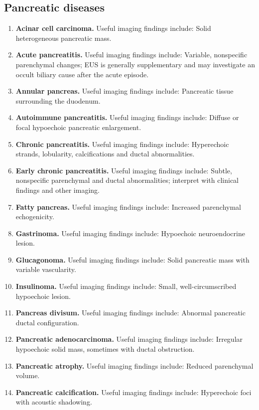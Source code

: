 \subsection{Pancreatic diseases}
\begin{enumerate}[leftmargin=*,itemsep=0.45em,topsep=0.4em]
\item \textbf{Acinar cell carcinoma.} Useful imaging findings include: Solid heterogeneous pancreatic mass.
\item \textbf{Acute pancreatitis.} Useful imaging findings include: Variable, nonspecific parenchymal changes; EUS is generally supplementary and may investigate an occult biliary cause after the acute episode.
\item \textbf{Annular pancreas.} Useful imaging findings include: Pancreatic tissue surrounding the duodenum.
\item \textbf{Autoimmune pancreatitis.} Useful imaging findings include: Diffuse or focal hypoechoic pancreatic enlargement.
\item \textbf{Chronic pancreatitis.} Useful imaging findings include: Hyperechoic strands, lobularity, calcifications and ductal abnormalities.
\item \textbf{Early chronic pancreatitis.} Useful imaging findings include: Subtle, nonspecific parenchymal and ductal abnormalities; interpret with clinical findings and other imaging.
\item \textbf{Fatty pancreas.} Useful imaging findings include: Increased parenchymal echogenicity.
\item \textbf{Gastrinoma.} Useful imaging findings include: Hypoechoic neuroendocrine lesion.
\item \textbf{Glucagonoma.} Useful imaging findings include: Solid pancreatic mass with variable vascularity.
\item \textbf{Insulinoma.} Useful imaging findings include: Small, well-circumscribed hypoechoic lesion.
\item \textbf{Pancreas divisum.} Useful imaging findings include: Abnormal pancreatic ductal configuration.
\item \textbf{Pancreatic adenocarcinoma.} Useful imaging findings include: Irregular hypoechoic solid mass, sometimes with ductal obstruction.
\item \textbf{Pancreatic atrophy.} Useful imaging findings include: Reduced parenchymal volume.
\item \textbf{Pancreatic calcification.} Useful imaging findings include: Hyperechoic foci with acoustic shadowing.

\end{enumerate}

